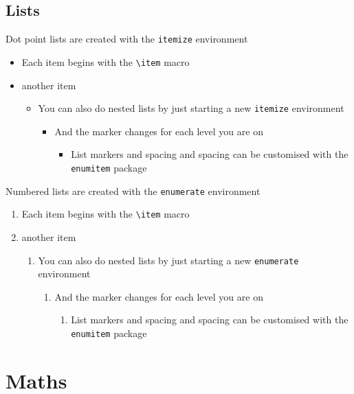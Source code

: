 \documentclass{article}
\begin{document}
\subsection{Lists}
Dot point lists are created with the \lstinline{itemize} environment
\begin{itemize}
  \item Each item begins with the \lstinline{\item} macro
  \item another item
    \begin{itemize}
      \item You can also do nested lists by just starting a new \lstinline{itemize} environment
        \begin{itemize}
          \item And the marker changes for each level you are on
            \begin{itemize}
              \item List markers and spacing and spacing can be customised with the \lstinline{enumitem} package
            \end{itemize}
        \end{itemize}
    \end{itemize}
\end{itemize}


Numbered lists are created with the \lstinline{enumerate} environment
\begin{enumerate}
  \item Each item begins with the \lstinline{\item} macro
  \item another item
    \begin{enumerate}
      \item You can also do nested lists by just starting a new \lstinline{enumerate} environment
        \begin{enumerate}
          \item And the marker changes for each level you are on
            \begin{enumerate}
              \item List markers and spacing and spacing can be customised with the \lstinline{enumitem} package
            \end{enumerate}
        \end{enumerate}
    \end{enumerate}
\end{enumerate}

\section{Maths}
\end{document}
